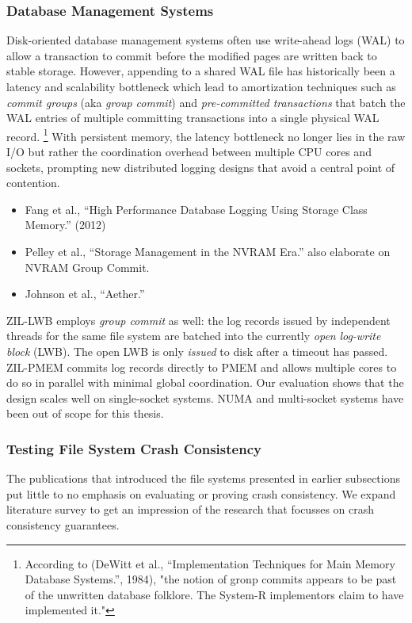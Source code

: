\documentclass[12pt,a4paper,twoside,draft]{book}
\begin{document}
\subsubsection{Database Management Systems}
Disk-oriented database management systems often use write-ahead logs (WAL) to allow a transaction to commit before the modified pages are written back to stable storage.
However, appending to a shared WAL file has historically been a latency and scalability bottleneck which lead to amortization techniques such as \textit{commit groups} (aka \textit{group commit}) and \textit{pre-committed transactions} that batch the WAL entries of multiple committing transactions into a single physical WAL record.%
\footnote{According to (DeWitt et al., “Implementation Techniques for Main Memory Database Systems.”, 1984), "the notion of gronp commits appears to be past of the unwritten database folklore. The System-R implementors claim to have implemented it."}
With persistent memory, the latency bottleneck no longer lies in the raw I/O but rather the coordination overhead between multiple CPU cores and sockets, prompting new distributed logging designs that avoid a central point of contention.
\begin{itemize}
\item Fang et al., “High Performance Database Logging Using Storage Class Memory.” (2012)
\item Pelley et al., “Storage Management in the NVRAM Era.” also elaborate on NVRAM Group Commit.
\item Johnson et al., “Aether.”
\end{itemize}
ZIL-LWB employs \textit{group commit} as well: the log records issued by independent threads for the same file system are batched into the currently \textit{open} \textit{log-write block} (LWB).
The open LWB is only \textit{issued} to disk after a timeout has passed.
ZIL-PMEM commits log records directly to PMEM and allows multiple cores to do so in parallel with minimal global coordination.
Our evaluation shows that the design scales well on single-socket systems.
NUMA and multi-socket systems have been out of scope for this thesis.

\subsubsection{Testing File System Crash Consistency}
The publications that introduced the file systems presented in earlier subsections put little to no emphasis on evaluating or proving crash consistency.
We expand literature survey to get an impression of the research that focusses on crash consistency guarantees.
\end{document}
